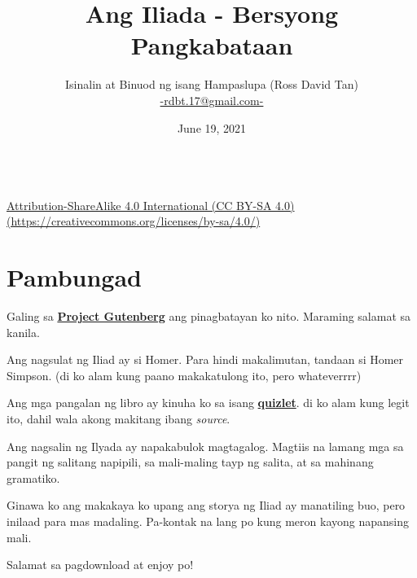 \documentclass[12pt,letterpaper]{report}
\begin{document}
\title{\textbf{Ang Iliada - Bersyong Pangkabataan}}
\author{Isinalin at Binuod ng isang Hampaslupa (Ross David Tan) \\ \href{mailto:rdbt.17@gmail.com}{-rdbt.17@gmail.com-}}
\date{June 19, 2021}
\maketitle

\vspace*{\fill}
\begin{center}
    \href{https://creativecommons.org/licenses/by-sa/4.0/}{\ccbysa \\[0.5cm] Attribution-ShareAlike 4.0 International (CC BY-SA 4.0) \\ (https://creativecommons.org/licenses/by-sa/4.0/)}

\end{center}
\vspace*{\fill}
\pagebreak
\tableofcontents
\pagebreak
\setlength{\parskip}{1em}
\chapter*{Pambungad}
\begin{center}

    Galing sa \href{https://www.gutenberg.org/}{\textbf{Project Gutenberg}} ang pinagbatayan ko nito. Maraming salamat sa kanila.

    Ang nagsulat ng Iliad ay si Homer. Para hindi makalimutan, tandaan si Homer Simpson. (di ko alam kung paano makakatulong ito, pero whateverrrr)

    Ang mga pangalan ng libro ay kinuha ko sa isang \href{https://quizlet.com/24340225/titles-of-each-book-in-the-iliad-flash-cards/}{\textbf{quizlet}}.     di ko alam kung legit ito, dahil wala akong makitang ibang \textit{source}.

    Ang nagsalin ng Ilyada ay napakabulok magtagalog. Magtiis na lamang mga sa pangit ng salitang napipili, sa mali-maling tayp ng salita, at sa mahinang gramatiko.

    Ginawa ko ang makakaya ko upang ang storya ng Iliad ay manatiling buo, pero inilaad para mas madaling. Pa-kontak na lang po kung meron kayong napansing mali.

    Salamat sa pagdownload at enjoy po!
    \vspace*{\fill}
\end{center}
\pagebreak
{}
\end{document}

